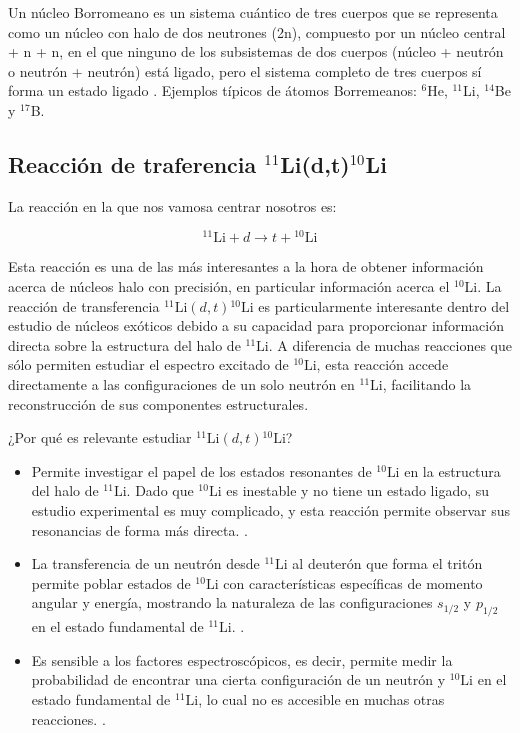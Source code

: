 Un núcleo Borromeano es un sistema cuántico de tres cuerpos que se representa como un núcleo con halo de dos neutrones (2n), compuesto por un núcleo central + n + n, en el que ninguno de los subsistemas de dos cuerpos (núcleo + neutrón o neutrón + neutrón) está ligado, pero el sistema completo de tres cuerpos sí forma un estado ligado \cite{tanihata2023lowEnergyHalo}. Ejemplos típicos de átomos Borremeanos: $^6$He, $^{11}$Li, $^{14}$Be y $^{17}$B. 

\subsection{Reacción de traferencia $^{11}$Li(d,t)$^{10}$Li}

La reacción en la que nos vamosa centrar nosotros es: 

\begin{equation}
   {}^{11}\text{Li} + d \to t + {}^{10}\text{Li}
\end{equation}

Esta reacción es una de las más interesantes a la hora de obtener información acerca de núcleos halo con precisión, en particular información acerca el $^{10}$Li. 
La reacción de transferencia \({}^{11}\text{Li}(d,t){}^{10}\text{Li}\) es particularmente interesante dentro del estudio de núcleos exóticos debido a su capacidad para proporcionar información directa sobre la estructura del halo de \({}^{11}\text{Li}\). A diferencia de muchas reacciones que sólo permiten estudiar el espectro excitado de \({}^{10}\text{Li}\), esta reacción accede directamente a las configuraciones de un solo neutrón en \({}^{11}\text{Li}\), facilitando la reconstrucción de sus componentes estructurales.


¿Por qué es relevante estudiar \({}^{11}\text{Li}(d,t){}^{10}\text{Li}\)?
\begin{itemize}
    \item Permite investigar el papel de los estados resonantes de \(^{10}\text{Li}\) en la estructura del halo de \(^{11}\text{Li}\). Dado que $^{10}\text{Li}$ es inestable y no tiene un estado ligado, su estudio experimental es muy complicado, y esta reacción permite observar sus resonancias de forma más directa. \cite{SANETULLAEV2016481}.
    
    \item La transferencia de un neutrón desde \(^{11}\text{Li}\) al deuterón que forma el tritón permite poblar estados de \(^{10}\text{Li}\) con características específicas de momento angular y energía, mostrando la naturaleza de las configuraciones \(s_{1/2}\) y \(p_{1/2}\) en el estado fundamental de \({}^{11}\text{Li}\).  \cite{CASAL2017307}. 
    
    \item Es sensible a los factores espectroscópicos, es decir, permite medir la probabilidad de encontrar una cierta configuración de un neutrón y \({}^{10}\text{Li}\) en el estado fundamental de \({}^{11}\text{Li}\), lo cual no es accesible en muchas otras reacciones. \cite{SANETULLAEV2016481}. 
\end{itemize}

